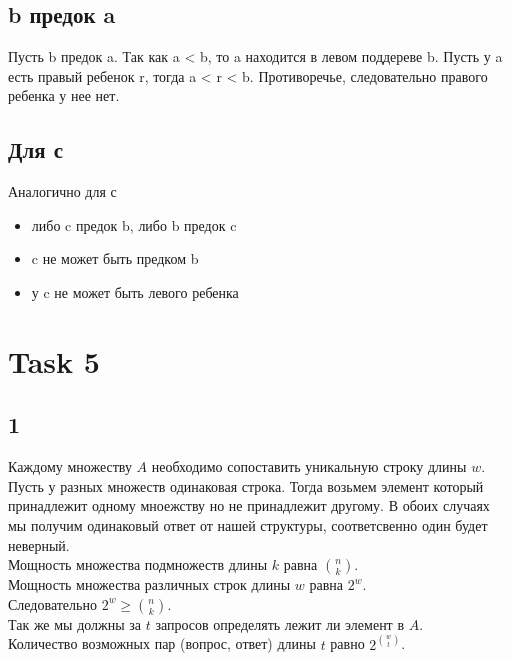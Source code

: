 \documentclass[12pt]{exam}
\begin{document}
\subsection*{b предок a}
Пусть b предок a.
Так как a < b, то a находится в левом поддереве b. 
Пусть у a есть правый ребенок r, тогда a < r < b. 
Противоречье, следовательно правого ребенка у нее нет.

\subsection*{Для с}
Аналогично для с 
\begin{itemize}
    \item либо c предок b, либо b предок c
    \item c не может быть предком b
    \item у c не может быть левого ребенка
\end{itemize}

\section*{Task 5}
\subsection*{1}
Каждому множеству $A$ необходимо сопоставить уникальную строку длины $w$.
Пусть у разных множеств одинаковая строка. 
Тогда возьмем элемент который принадлежит одному мноежству но не принадлежит другому. 
В обоих случаях мы получим одинаковый ответ от нашей структуры, соответсвенно один будет неверный. \\
Мощность множества подмножеств длины $k$ равна ${n \choose k}$. \\
Мощность множества различных строк длины $w$ равна $2^w$.\\
Следовательно $2^w \geq {n \choose k}$. \\
Так же мы должны за $t$ запросов определять лежит ли элемент в $A$. \\
Количество возможных пар (вопрос, ответ) длины $t$ равно $2 ^ { {w \choose t} }$.
\end{document}
